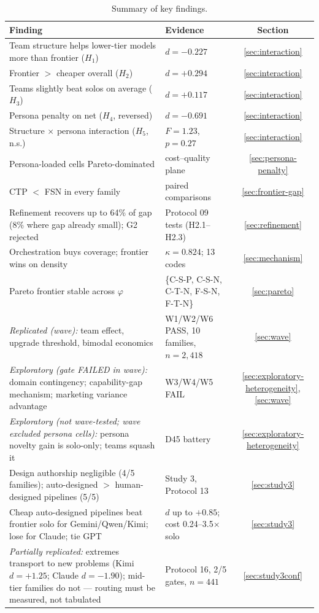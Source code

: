 \documentclass[12pt,a4paper]{article}
\newcommand{\phiBlend}{\varphi}
\begin{document}
\begin{table}[ht]
  \centering
  \caption{Summary of key findings.}
  \label{tab:summary-findings}
  \begin{tabularx}{\textwidth}{@{}l l c@{}}
    \toprule
    \textbf{Finding} & \textbf{Evidence} & \textbf{Section} \\
    \midrule
    Team structure helps lower-tier models more than frontier ($H_1$) & $d = -0.227$ & \cref{sec:interaction} \\
    Frontier $>$ cheaper overall ($H_2$) & $d = +0.294$ & \cref{sec:interaction} \\
    Teams slightly beat solos on average ($H_3$) & $d = +0.117$ & \cref{sec:interaction} \\
    Persona penalty on net ($H_4$, reversed) & $d = -0.691$ & \cref{sec:interaction} \\
    Structure $\times$ persona interaction ($H_5$, n.s.) & $F = 1.23$, $p = 0.27$ & \cref{sec:interaction} \\
    Persona-loaded cells Pareto-dominated & cost--quality plane & \cref{sec:persona-penalty} \\
    CTP $<$ FSN in every family & paired comparisons & \cref{sec:frontier-gap} \\
    Refinement recovers up to 64\% of gap (8\% where gap already small); G2 rejected & Protocol 09 tests (H2.1--H2.3) & \cref{sec:refinement} \\
    Orchestration buys coverage; frontier wins on density & $\kappa = 0.824$; 13 codes & \cref{sec:mechanism} \\
    Pareto frontier stable across $\phiBlend$ & \{C-S-P, C-S-N, C-T-N, F-S-N, F-T-N\} & \cref{sec:pareto} \\
    \emph{Replicated (wave):} team effect, upgrade threshold, bimodal economics & W1/W2/W6 PASS, 10 families, $n = 2{,}418$ & \cref{sec:wave} \\
    \emph{Exploratory (gate FAILED in wave):} domain contingency; capability-gap mechanism; marketing variance advantage & W3/W4/W5 FAIL & \cref{sec:exploratory-heterogeneity}, \cref{sec:wave} \\
    \emph{Exploratory (not wave-tested; wave excluded persona cells):} persona novelty gain is solo-only; teams squash it & D45 battery & \cref{sec:exploratory-heterogeneity} \\
    Design authorship negligible (4/5 families); auto-designed $>$ human-designed pipelines (5/5) & Study 3, Protocol 13 & \cref{sec:study3} \\
    Cheap auto-designed pipelines beat frontier solo for Gemini/Qwen/Kimi; lose for Claude; tie GPT & $d$ up to $+0.85$; cost 0.24--3.5$\times$ solo & \cref{sec:study3} \\
    \emph{Partially replicated:} extremes transport to new problems (Kimi $d = +1.25$; Claude $d = -1.90$); mid-tier families do not --- routing must be measured, not tabulated & Protocol 16, 2/5 gates, $n = 441$ & \cref{sec:study3conf} \\
    \bottomrule
  \end{tabularx}
\end{table}
\end{document}
